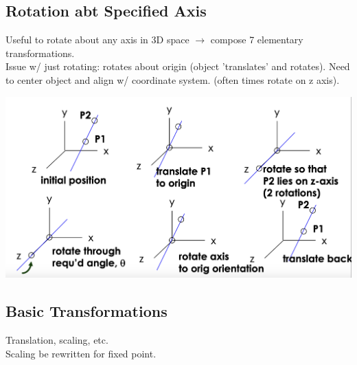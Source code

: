 \documentclass{article}
\begin{document}
\subsection{Rotation abt Specified Axis}
Useful to rotate about any axis in 3D space $\to$ compose 7 elementary transformations.
\\
Issue w/ just rotating: rotates about origin (object 'translates' and rotates).
Need to center object and align w/ coordinate system. (often times rotate on z axis).
\begin{center}
    \includegraphics*[width=.8\textwidth]{"imgs/rotation spec axis.png"}
\end{center}

\subsection{Basic Transformations}
Translation, scaling, etc.\\
Scaling be rewritten for fixed point.
\end{document}

